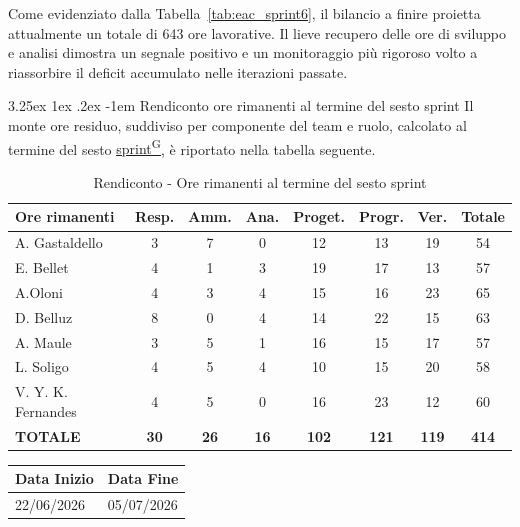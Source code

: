 \documentclass[a4paper,12pt]{article}
\makeatletter
\newcounter{subsubsubsection}[subsubsection]
\renewcommand\paragraph{\@startsection{paragraph}{5}{\z@}%
  {3.25ex \@plus1ex \@minus.2ex}%
  {-1em}%
  {\normalfont\normalsize\bfseries}}
\providecommand{\glslink}[2]{\href{https://alittlebyte-19.github.io/Documentazione/glossario.html\#gls-#1}{\underline{#2}\textsuperscript{\scriptsize G}}}
\makeatother
\begin{document}
Come evidenziato dalla Tabella~\ref{tab:eac_sprint6}, il bilancio a finire proietta attualmente un totale di 643 ore lavorative. Il lieve recupero delle ore di sviluppo e analisi dimostra un segnale positivo e un monitoraggio più rigoroso volto a riassorbire il deficit accumulato nelle iterazioni passate.


\paragraph{Rendiconto ore rimanenti al termine del sesto sprint}
Il monte ore residuo, suddiviso per componente del team e ruolo, calcolato al termine del sesto \glslink{sprint}{sprint}, è riportato nella tabella seguente.
\begin{table}[htbp]
\centering
\renewcommand{\arraystretch}{1.5} 
\begin{tabularx}{\textwidth}{|X|c|c|c|c|c|c|c|}
\hline
\textbf{Ore rimanenti} & \textbf{Resp.} & \textbf{Amm.} & \textbf{Ana.} & \textbf{Proget.} & \textbf{Progr.} & \textbf{Ver.} & \textbf{Totale} \\
\hline
A. Gastaldello & 3 & 7 & 0 & 12 & 13 & 19 & 54 \\
\hline
E. Bellet & 4 & 1 & 3 & 19 & 17 & 13 & 57 \\
\hline
A.Oloni & 4 & 3 & 4 & 15 & 16 & 23 & 65 \\
\hline
D. Belluz & 8 & 0 & 4 & 14 & 22 & 15 & 63 \\
\hline
A. Maule & 3 & 5 & 1 & 16 & 15 & 17 & 57 \\
\hline
L. Soligo & 4 & 5 & 4 & 10 & 15 & 20 & 58 \\
\hline
V. Y. K. Fernandes & 4 & 5 & 0 & 16 & 23 & 12 & 60 \\
\hline
\rowcolor{gray!20}
\textbf{TOTALE} & \textbf{30} & \textbf{26} & \textbf{16} & \textbf{102} & \textbf{121} & \textbf{119} & \textbf{414} \\
\hline
\end{tabularx}
\caption{Rendiconto - Ore rimanenti al termine del sesto sprint}
\end{table}


\newpage


\label{sec:rtb_settimoperiodo}
\begin{table}[H]
    \centering
    \renewcommand{\arraystretch}{1.5}
    \begin{tabularx}{\textwidth}{|X|X|}
    \hline \rowcolor{Dandelion!50}
    \textbf{Data Inizio} & \textbf{Data Fine}\\
    \hline
    22/06/2026 & 05/07/2026\\
    \hline

    \end{tabularx}
\end{table}
\end{document}

